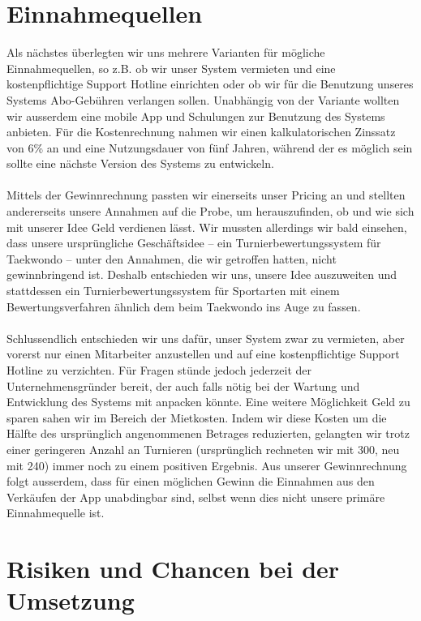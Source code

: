 \section{Einnahmequellen}
Als nächstes überlegten wir uns mehrere Varianten für mögliche Einnahmequellen, so z.B. ob wir unser System vermieten und
    eine kostenpflichtige Support Hotline einrichten oder ob wir für die Benutzung unseres Systems
    Abo-Gebühren verlangen sollen.
Unabhängig von der Variante wollten wir ausserdem eine mobile App und Schulungen zur Benutzung des Systems anbieten.
Für die Kostenrechnung nahmen wir einen kalkulatorischen Zinssatz von 6\% an und eine Nutzungsdauer von fünf Jahren,
während der es möglich sein sollte eine nächste Version des Systems zu entwickeln.
\\\\
Mittels der Gewinnrechnung passten wir einerseits unser Pricing an und stellten andererseits unsere Annahmen auf die Probe,
um herauszufinden, ob und wie sich mit unserer Idee Geld verdienen lässt.
Wir mussten allerdings wir bald einsehen, dass unsere ursprüngliche Geschäftsidee – ein Turnierbewertungssystem für
Taekwondo – unter den Annahmen, die wir getroffen hatten, nicht gewinnbringend ist.
Deshalb entschieden wir uns, unsere Idee auszuweiten und stattdessen ein Turnierbewertungssystem für Sportarten mit einem
Bewertungsverfahren ähnlich dem beim Taekwondo ins Auge zu fassen.
\\\\
Schlussendlich entschieden wir uns dafür, unser System zwar zu vermieten, aber vorerst nur einen Mitarbeiter anzustellen
und auf eine kostenpflichtige Support Hotline zu verzichten.
Für Fragen stünde jedoch jederzeit der Unternehmensgründer bereit, der auch falls nötig bei der Wartung und Entwicklung
des Systems mit anpacken könnte.
Eine weitere Möglichkeit Geld zu sparen sahen wir im Bereich der Mietkosten.
Indem wir diese Kosten um die Hälfte des ursprünglich angenommenen Betrages reduzierten, gelangten wir trotz einer
geringeren Anzahl an Turnieren (ursprünglich rechneten wir mit 300, neu mit 240) immer noch zu einem positiven Ergebnis.
Aus unserer Gewinnrechnung folgt ausserdem, dass für einen möglichen Gewinn die Einnahmen aus den Verkäufen der App unabdingbar sind,
selbst wenn dies nicht unsere primäre Einnahmequelle ist.

\section{Risiken und Chancen bei der Umsetzung}


